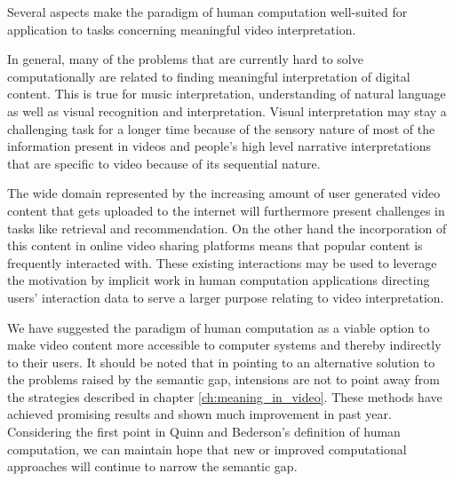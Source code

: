 Several aspects make the paradigm of human computation well-suited for application to tasks concerning meaningful video interpretation.

In general, many of the problems that are currently hard to solve computationally are related to finding meaningful interpretation of digital content. This is true for music interpretation, understanding of natural language as well as visual recognition and interpretation. Visual interpretation may stay a challenging task for a longer time because of the sensory nature of most of the information present in videos and people's high level narrative interpretations that are specific to video because of its sequential nature.

The wide domain represented by the increasing amount of user generated video content that gets uploaded to the internet will furthermore present challenges in tasks like retrieval and recommendation. On the other hand the incorporation of this content in online video sharing platforms means that popular content is frequently interacted with. These existing interactions may be used to leverage the motivation by implicit work in human computation applications directing users' interaction data to serve a larger purpose relating to video interpretation.

We have suggested the paradigm of human computation as a viable option to make video content more accessible to computer systems and thereby indirectly to their users. It should be noted that in pointing to an alternative solution to the problems raised by the semantic gap, intensions are not to point away from the strategies described in chapter \ref{ch:meaning_in_video}. These methods have achieved promising results and shown much improvement in past year. Considering the first point in Quinn and Bederson's definition of human computation, we can maintain hope that new or improved computational approaches will continue to narrow the semantic gap.



